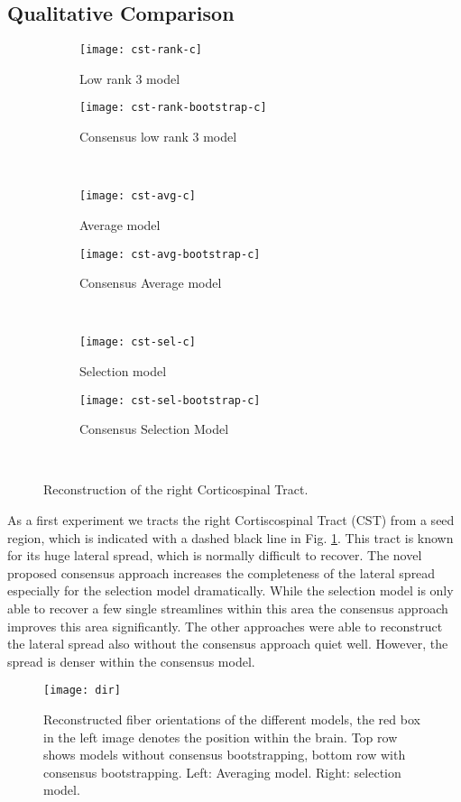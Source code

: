\subsection{Qualitative Comparison}
\begin{figure}[t]
	\centering
	\begin{subfigure}[b]{0.45\linewidth}
		\texttt{[image: cst-rank-c]}
		\caption{Low rank 3 model}
	\end{subfigure}
	\begin{subfigure}[b]{0.45\linewidth}
		\texttt{[image: cst-rank-bootstrap-c]}
		\caption{Consensus low rank 3 model}
\end{subfigure} \\
	\begin{subfigure}[b]{0.45\linewidth}
		\texttt{[image: cst-avg-c]}
		\caption{Average model}
	\end{subfigure}
	\begin{subfigure}[b]{0.45\linewidth}
		\texttt{[image: cst-avg-bootstrap-c]}
		\caption{Consensus Average model}
\end{subfigure} \\
	\begin{subfigure}[b]{0.45\linewidth}
		\texttt{[image: cst-sel-c]}
		\caption{Selection model}
	\end{subfigure}
	\begin{subfigure}[b]{0.45\linewidth}
		\texttt{[image: cst-sel-bootstrap-c]}
		\caption{Consensus Selection Model}
\end{subfigure} \\
\caption{Reconstruction of the right Corticospinal Tract.}
	\label{fig:CST}
\end{figure}
As a first experiment we tracts the right Cortiscospinal Tract (CST) from a seed
region, which is indicated with a dashed black line in Fig. \ref{fig:CST}. This tract is
known for its huge lateral spread, which is normally difficult to recover. The
novel proposed consensus approach increases the completeness of the lateral
spread especially for the selection model dramatically. While the selection
model is only able to recover a few single streamlines within this area the
consensus approach improves this area significantly. The other approaches
were able to reconstruct the lateral spread also without the consensus approach
quiet well. However, the spread is denser within the consensus model. 
\begin{figure*}[t]
	\centering
	\texttt{[image: dir]}
	\caption{Reconstructed fiber orientations of the different models, the
	red box in the left image denotes the position within the brain. Top row
shows models without consensus bootstrapping, bottom row with consensus
bootstrapping. Left: Averaging model. Right: selection model.}
	\label{fig:directions}
\end{figure*}

